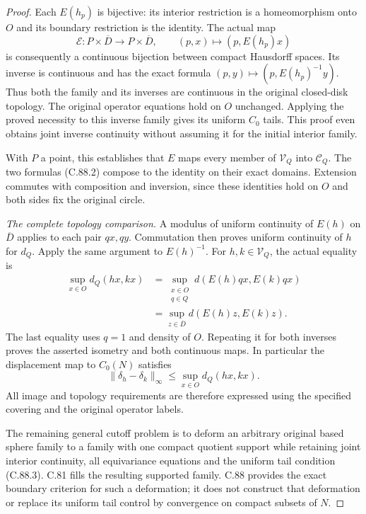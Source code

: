 \begin{proof}
Each $E(h_p)$ is bijective: its
interior restriction is a homeomorphism
onto $O$ and its boundary restriction
is the identity. The actual map
\[
 \mathcal E:P\times\overline D
       \longrightarrow P\times\overline D,\qquad
             (p,x)\longmapsto(p,E(h_p)x)                         \tag{C.88.12}
\]
is consequently a continuous bijection
between compact Hausdorff spaces.
Its inverse is continuous and has
the exact formula
$(p,y)\mapsto(p,E(h_p)^{-1}y)$.
Thus both the family and its inverses
are continuous in the original
closed-disk topology. The original
operator equations hold on $O$
unchanged. Applying the proved
necessity to this inverse family
gives its uniform $C_0$ tails.
This proof even obtains joint inverse
continuity without assuming it for
the initial interior family.

With $P$ a point, this establishes
that $E$ maps every member of
$\mathscr V_Q$ into $\mathscr C_Q$.
The two formulas (C.88.2) compose
to the identity on their exact
domains. Extension commutes with
composition and inversion, since
these identities hold on $O$ and
both sides fix the original circle.

\emph{The complete topology comparison.}
A modulus of uniform continuity
of $E(h)$ on $\overline D$ applies
to each pair $qx,qy$. Commutation
then proves uniform continuity of
$h$ for $d_Q$. Apply the same
argument to $E(h)^{-1}$.
For $h,k\in\mathscr V_Q$, the
actual equality is
\[
 \begin{split}
 \sup_{x\in O}d_Q(hx,kx)
  &=\sup_{\substack{x\in O\\ q\in Q}}
               d(E(h)qx,E(k)qx)\\
  &=\sup_{z\in\overline D}d(E(h)z,E(k)z).
 \end{split}                                                   \tag{C.88.13}
\]
The last equality uses $q=1$ and
density of $O$. Repeating it for
both inverses proves the asserted
isometry and both continuous maps.
In particular the displacement map
to $C_0(N)$ satisfies
\[
 \|\delta_h-\delta_k\|_\infty
       \leq\sup_{x\in O}d_Q(hx,kx).                             \tag{C.88.14}
\]
All image and topology requirements
are therefore expressed using the
specified covering and the original
operator labels.

The remaining general cutoff problem
is to deform an arbitrary original
based sphere family to a family with
one compact quotient support while
retaining joint interior continuity,
all equivariance equations and the
uniform tail condition (C.88.3).
C.81 fills the resulting supported
family. C.88 provides the exact
boundary criterion for such a
deformation; it does not construct
that deformation or replace its
uniform tail control by convergence
on compact subsets of $N$.
\end{proof}

